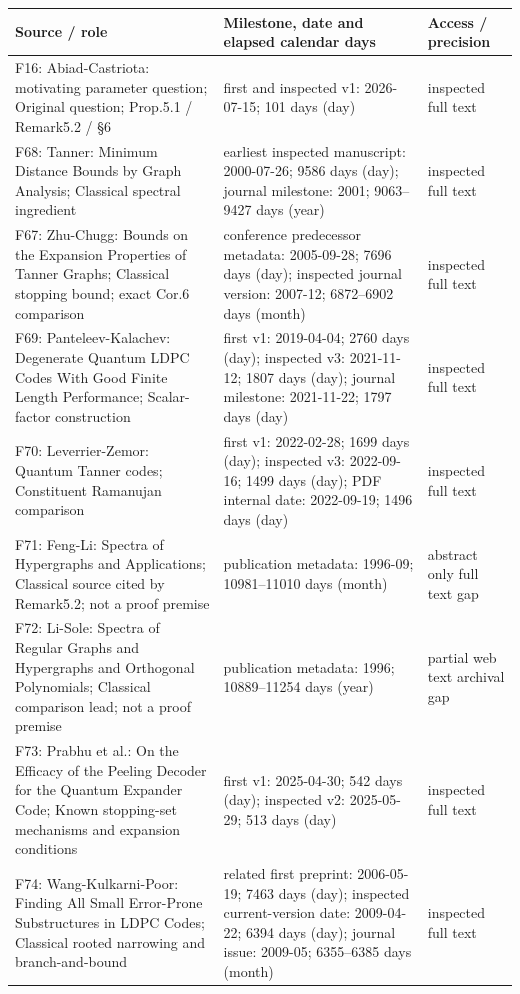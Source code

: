 {\small
\begin{longtable}{@{}>{\raggedright\arraybackslash}p{.27\linewidth}>{\raggedright\arraybackslash}p{.47\linewidth}>{\raggedright\arraybackslash}p{.18\linewidth}@{}}
\toprule
\textbf{Source / role} & \textbf{Milestone, date and elapsed calendar days} & \textbf{Access / precision}\\\midrule\endhead
F16: Abiad-Castriota: motivating parameter question; Original question; Prop.5.1 / Remark5.2 / §6 & first and inspected v1: 2026-07-15; 101 days (day) & inspected full text\\[4pt]
F68: Tanner: Minimum Distance Bounds by Graph Analysis; Classical spectral ingredient & earliest inspected manuscript: 2000-07-26; 9586 days (day); journal milestone: 2001; 9063--9427 days (year) & inspected full text\\[4pt]
F67: Zhu-Chugg: Bounds on the Expansion Properties of Tanner Graphs; Classical stopping bound; exact Cor.6 comparison & conference predecessor metadata: 2005-09-28; 7696 days (day); inspected journal version: 2007-12; 6872--6902 days (month) & inspected full text\\[4pt]
F69: Panteleev-Kalachev: Degenerate Quantum LDPC Codes With Good Finite Length Performance; Scalar-factor construction & first v1: 2019-04-04; 2760 days (day); inspected v3: 2021-11-12; 1807 days (day); journal milestone: 2021-11-22; 1797 days (day) & inspected full text\\[4pt]
F70: Leverrier-Zemor: Quantum Tanner codes; Constituent Ramanujan comparison & first v1: 2022-02-28; 1699 days (day); inspected v3: 2022-09-16; 1499 days (day); PDF internal date: 2022-09-19; 1496 days (day) & inspected full text\\[4pt]
F71: Feng-Li: Spectra of Hypergraphs and Applications; Classical source cited by Remark5.2; not a proof premise & publication metadata: 1996-09; 10981--11010 days (month) & abstract only full text gap\\[4pt]
F72: Li-Sole: Spectra of Regular Graphs and Hypergraphs and Orthogonal Polynomials; Classical comparison lead; not a proof premise & publication metadata: 1996; 10889--11254 days (year) & partial web text archival gap\\[4pt]
F73: Prabhu et al.: On the Efficacy of the Peeling Decoder for the Quantum Expander Code; Known stopping-set mechanisms and expansion conditions & first v1: 2025-04-30; 542 days (day); inspected v2: 2025-05-29; 513 days (day) & inspected full text\\[4pt]
F74: Wang-Kulkarni-Poor: Finding All Small Error-Prone Substructures in LDPC Codes; Classical rooted narrowing and branch-and-bound & related first preprint: 2006-05-19; 7463 days (day); inspected current-version date: 2009-04-22; 6394 days (day); journal issue: 2009-05; 6355--6385 days (month) & inspected full text\\[4pt]

\end{longtable}}
